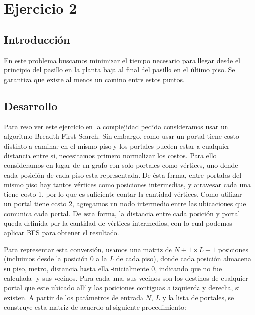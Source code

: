 
\section{Ejercicio 2}
\subsection{Introducción}
En este problema buscamos minimizar el tiempo necesario para llegar desde el principio del pasillo en la planta baja al final del pasillo en el último piso.
Se garantiza que existe al menos un camino entre estos puntos.


\subsection{Desarrollo}
Para resolver este ejercicio en la complejidad pedida consideramos usar un algoritmo Breadth-First Search.
Sin embargo, como usar un portal tiene costo distinto a caminar en el mismo piso y los portales pueden estar a cualquier distancia entre si, necesitamos primero normalizar los costos.
Para ello consideramos en lugar de un grafo con solo portales como vértices, uno donde cada posición de cada piso esta representada.
De ésta forma, entre portales del mismo piso hay tantos vértices como posiciones intermedias, y atravesar cada una tiene costo 1, por lo que es suficiente contar la cantidad vértices.
Como utilizar un portal tiene costo 2, agregamos un nodo intermedio entre las ubicaciones que comunica cada portal.
De esta forma, la distancia entre cada posición y portal queda definida por la cantidad de vértices intermedios, con lo cual podemos aplicar BFS para obtener el resultado.


Para representar esta conversión, usamos una matriz de $N+1 \times  L+1$ posiciones (incluimos desde la posición $0$ a la $L$ de cada piso), donde cada posición almacena su piso, metro, distancia hasta ella -inicialmente 0, indicando que no fue calculada- y sus vecinos. 
Para cada una, sus vecinos son los destinos de cualquier portal que este ubicado allí y las posiciones contiguas a izquierda y derecha, si existen. A partir de los parámetros de entrada $N$, $L$ y la lista de portales, se construye esta matriz de acuerdo al siguiente procedimiento:


